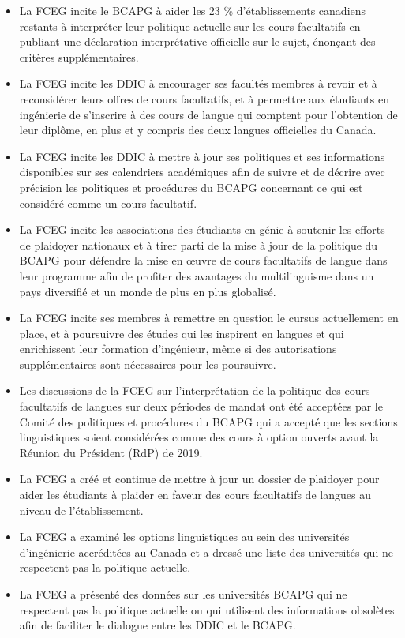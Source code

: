 \begin{itemize}
 \item La FCEG incite le BCAPG à aider les 23 \% d'établissements canadiens restants à interpréter leur politique actuelle sur les cours facultatifs en publiant une déclaration interprétative officielle sur le sujet, énonçant des critères supplémentaires.
 \item La FCEG incite les DDIC à encourager ses facultés membres à revoir et à reconsidérer leurs offres de cours facultatifs, et à permettre aux étudiants en ingénierie de s'inscrire à des cours de langue qui comptent pour l'obtention de leur diplôme, en plus et y compris des deux langues officielles du Canada.
 \item La FCEG incite les DDIC à mettre à jour ses politiques et ses informations disponibles sur ses calendriers académiques afin de suivre et de décrire avec précision les politiques et procédures du BCAPG concernant ce qui est considéré comme un cours facultatif.
 \item La FCEG incite les associations des étudiants en génie à soutenir les efforts de plaidoyer nationaux et à tirer parti de la mise à jour de la politique du BCAPG pour défendre la mise en œuvre de cours facultatifs de langue dans leur programme afin de profiter des avantages du multilinguisme dans un pays diversifié et un monde de plus en plus globalisé.
 \item La FCEG incite ses membres à remettre en question le cursus actuellement en place, et à poursuivre des études qui les inspirent en langues et qui enrichissent leur formation d'ingénieur, même si des autorisations supplémentaires sont nécessaires pour les poursuivre.
\end{itemize}

\begin{itemize}
 \item Les discussions de la FCEG sur l'interprétation de la politique des cours facultatifs de langues sur deux périodes de mandat ont été acceptées par le Comité des politiques et procédures du BCAPG qui a accepté que les sections linguistiques soient considérées comme des cours à option ouverts avant la Réunion du Président (RdP) de 2019.
 \item La FCEG a créé et continue de mettre à jour un dossier de plaidoyer pour aider les étudiants à plaider en faveur des cours facultatifs de langues au niveau de l'établissement.
 \item La FCEG a examiné les options linguistiques au sein des universités d'ingénierie accréditées au Canada et a dressé une liste des universités qui ne respectent pas la politique actuelle.
 \item La FCEG a présenté des données sur les universités BCAPG qui ne respectent pas la politique actuelle ou qui utilisent des informations obsolètes afin de faciliter le dialogue entre les DDIC et le BCAPG.
\end{itemize}

